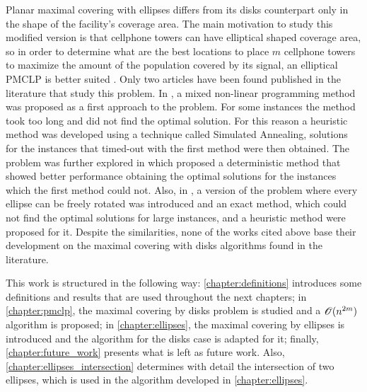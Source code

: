 Planar maximal covering with ellipses differs from its disks counterpart only in the shape of the facility's coverage area. The main motivation to study this modified version is that cellphone towers can have elliptical shaped coverage area, so in order to determine what are the best locations to place $m$ cellphone towers to maximize the amount of the population covered by its signal, an elliptical PMCLP is better suited \cite{canbolat}. Only two articles have been found published in the literature that study this problem. In \cite{canbolat}, a mixed non-linear programming method was proposed as a first approach to the problem. For some instances the method took too long and did not find the optimal solution. For this reason a heuristic method was developed using a technique called Simulated Annealing, solutions for the instances that timed-out with the first method were then obtained. The problem was further explored in \cite{andreta} which proposed a deterministic method that showed better performance obtaining the optimal solutions for the instances which the first method could not. Also, in \cite{andreta}, a version of the problem where every ellipse can be freely rotated was introduced and an exact method, which could not find the optimal solutions for large instances, and a heuristic method were proposed for it. Despite the similarities, none of the works cited above base their development on the maximal covering with disks algorithms found in the literature.


This work is structured in the following way: \autoref{chapter:definitions} introduces some definitions and results that are used throughout the next chapters; in \autoref{chapter:pmclp}, the maximal covering by disks problem is studied and a $\mathscr{O}(n^{2m})$ algorithm is proposed; in \autoref{chapter:ellipses}, the maximal covering by ellipses is introduced and the algorithm for the disks case is adapted for it; finally, \autoref{chapter:future_work} presents what is left as future work. Also, \autoref{chapter:ellipses_intersection} determines with detail the intersection of two ellipses, which is used in the algorithm developed in \autoref{chapter:ellipses}.

